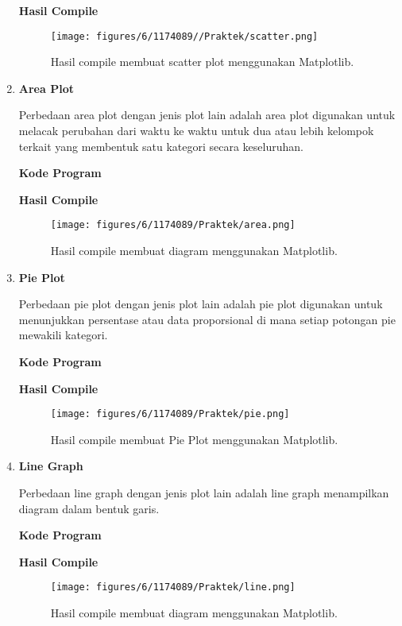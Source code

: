 \begin{enumerate}
	\textbf{Hasil Compile}
	
	\begin{figure}[H]
		\texttt{[image: figures/6/1174089//Praktek/scatter.png]}
		\centering
		\caption{Hasil compile membuat scatter plot menggunakan Matplotlib.}
	\end{figure}
	
	\item \textbf{Area Plot}
	
	Perbedaan area plot dengan jenis plot lain adalah area plot digunakan untuk melacak perubahan dari waktu ke waktu untuk dua atau lebih kelompok terkait yang membentuk satu kategori secara keseluruhan.
	
	\textbf{Kode Program}
	
	
	
	\textbf{Hasil Compile}
	
	\begin{figure}[H]
		\texttt{[image: figures/6/1174089/Praktek/area.png]}
		\centering
		\caption{Hasil compile membuat diagram menggunakan Matplotlib.}
	\end{figure}
	
	\item \textbf{Pie Plot}
	
	Perbedaan pie plot dengan jenis plot lain adalah pie plot digunakan untuk menunjukkan persentase atau data proporsional di mana setiap potongan pie mewakili kategori.
	
	\textbf{Kode Program}
	
	
	
	\textbf{Hasil Compile}
	
	\begin{figure}[H]
		\texttt{[image: figures/6/1174089/Praktek/pie.png]}
		\centering
		\caption{Hasil compile membuat Pie Plot menggunakan Matplotlib.}
	\end{figure}
	
	\item \textbf{Line Graph}
	
	Perbedaan line graph dengan jenis plot lain adalah line graph menampilkan diagram dalam bentuk garis.
	
	\textbf{Kode Program}
	
	
	
	\textbf{Hasil Compile}
	
	\begin{figure}[H]
		\texttt{[image: figures/6/1174089/Praktek/line.png]}
		\centering
		\caption{Hasil compile membuat diagram menggunakan Matplotlib.}
	\end{figure}
	
\end{enumerate}


